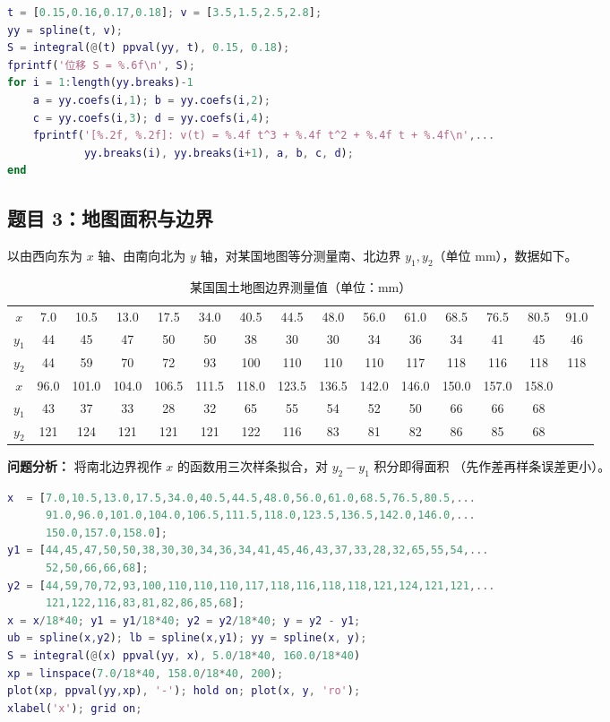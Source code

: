 \documentclass[zihao=5,a4paper]{ctexart}
\begin{document}
\begin{lstlisting}[language=Matlab]
t = [0.15,0.16,0.17,0.18]; v = [3.5,1.5,2.5,2.8];
yy = spline(t, v);
S = integral(@(t) ppval(yy, t), 0.15, 0.18);
fprintf('位移 S = %.6f\n', S);
for i = 1:length(yy.breaks)-1
    a = yy.coefs(i,1); b = yy.coefs(i,2);
    c = yy.coefs(i,3); d = yy.coefs(i,4);
    fprintf('[%.2f, %.2f]: v(t) = %.4f t^3 + %.4f t^2 + %.4f t + %.4f\n',...
            yy.breaks(i), yy.breaks(i+1), a, b, c, d);
end
\end{lstlisting}

\subsection{题目 3：地图面积与边界}
以由西向东为 $x$ 轴、由南向北为 $y$ 轴，对某国地图等分测量南、北边界
$y_1,y_2$（单位 mm），数据如下。

\begin{table}[H]
\centering\footnotesize
\caption{某国国土地图边界测量值（单位：mm）}
\begin{tabular}{c*{14}{c}}
\toprule
$x$  & 7.0 & 10.5 & 13.0 & 17.5 & 34.0 & 40.5 & 44.5 & 48.0 & 56.0 & 61.0 & 68.5 & 76.5 & 80.5 & 91.0\\
$y_1$& 44 & 45 & 47 & 50 & 50 & 38 & 30 & 30 & 34 & 36 & 34 & 41 & 45 & 46\\
$y_2$& 44 & 59 & 70 & 72 & 93 & 100& 110& 110& 110& 117& 118& 116& 118& 118\\
\midrule
$x$  & 96.0 & 101.0 & 104.0 & 106.5 & 111.5 & 118.0 & 123.5 & 136.5 & 142.0 & 146.0 & 150.0 & 157.0 & 158.0 &\\
$y_1$& 43 & 37 & 33 & 28 & 32 & 65 & 55 & 54 & 52 & 50 & 66 & 66 & 68 &\\
$y_2$& 121& 124& 121& 121& 121& 122& 116& 83 & 81 & 82 & 86 & 85 & 68 &\\
\bottomrule
\end{tabular}
\end{table}

\textbf{问题分析：} 将南北边界视作 $x$ 的函数用三次样条拟合，对 $y_2-y_1$ 积分即得面积
（先作差再样条误差更小）。

\begin{lstlisting}[language=Matlab]
x  = [7.0,10.5,13.0,17.5,34.0,40.5,44.5,48.0,56.0,61.0,68.5,76.5,80.5,...
      91.0,96.0,101.0,104.0,106.5,111.5,118.0,123.5,136.5,142.0,146.0,...
      150.0,157.0,158.0];
y1 = [44,45,47,50,50,38,30,30,34,36,34,41,45,46,43,37,33,28,32,65,55,54,...
      52,50,66,66,68];
y2 = [44,59,70,72,93,100,110,110,110,117,118,116,118,118,121,124,121,121,...
      121,122,116,83,81,82,86,85,68];
x = x/18*40; y1 = y1/18*40; y2 = y2/18*40; y = y2 - y1;
ub = spline(x,y2); lb = spline(x,y1); yy = spline(x, y);
S = integral(@(x) ppval(yy, x), 5.0/18*40, 160.0/18*40)
xp = linspace(7.0/18*40, 158.0/18*40, 200);
plot(xp, ppval(yy,xp), '-'); hold on; plot(x, y, 'ro');
xlabel('x'); grid on;
\end{lstlisting}
\end{document}

